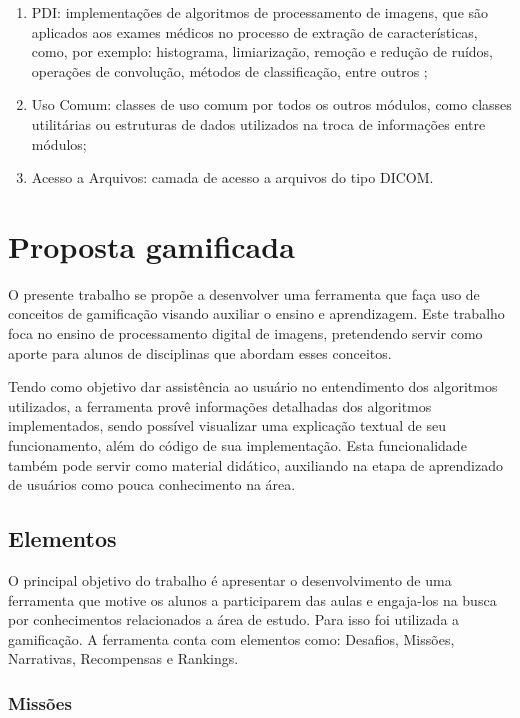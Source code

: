 \documentclass[
	12pt,				%
	oneside,			%
	a4paper,			%
	english,			%
	french,				%
	spanish,			%
	brazil,				%
	]{abntex2}
\begin{document}
\begin{enumerate}
\item PDI: implementações de algoritmos de processamento de imagens, que são aplicados aos exames médicos no processo de extração de características, como, por exemplo: histograma, limiarização, remoção e redução de ruídos, operações de convolução, métodos de classificação, entre outros \cite{reisferramenta}; 
\item Uso Comum: classes de uso  comum  por todos os outros módulos, como classes utilitárias ou estruturas de dados utilizados na troca de informações entre módulos; 
\item Acesso a Arquivos: camada de acesso a arquivos do tipo DICOM.
\end{enumerate}

\section{Proposta gamificada}
\label{sec:propostaGamificada}

O presente trabalho se propõe a desenvolver uma ferramenta que faça uso de conceitos de gamificação visando auxiliar o ensino e aprendizagem. Este trabalho foca no ensino de processamento digital de imagens, pretendendo servir como aporte para alunos de disciplinas que abordam esses conceitos.

Tendo como objetivo dar assistência ao usuário no entendimento dos algoritmos utilizados, a ferramenta provê informações detalhadas dos algoritmos implementados, sendo possível visualizar uma explicação textual de seu funcionamento, além do código de sua implementação. Esta funcionalidade também pode servir como material didático, auxiliando na etapa de aprendizado de usuários como pouca conhecimento na área.

\subsection{Elementos}

O principal objetivo do trabalho é apresentar o desenvolvimento de uma ferramenta que motive os alunos a participarem das aulas e engaja-los na busca por conhecimentos relacionados a área de estudo. Para isso foi utilizada a gamificação. A ferramenta conta com elementos como: Desafios, Missões, Narrativas, Recompensas e Rankings.

\subsubsection{Missões}
\end{document}
